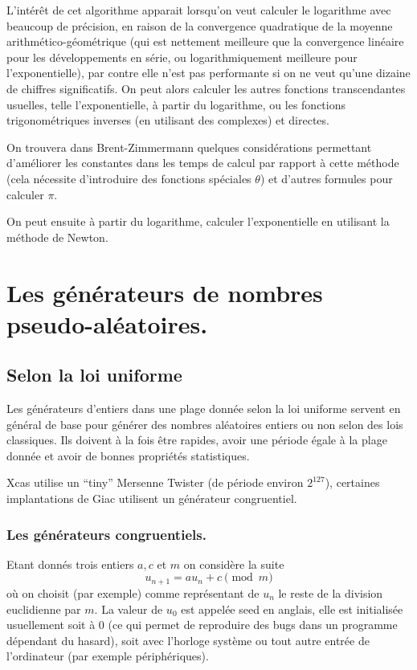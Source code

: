 \documentclass[a4paper,11pt]{article}
\begin{document}
L'int\'er\^et de cet algorithme apparait lorsqu'on veut calculer
le logarithme avec beaucoup de pr\'ecision, en raison de la
convergence quadratique de la moyenne arithm\'etico-g\'eom\'etrique
(qui est nettement meilleure que la convergence lin\'eaire
pour les d\'eveloppements en s\'erie, ou logarithmiquement
meilleure pour l'exponentielle), par contre elle n'est pas
performante si on ne veut qu'une dizaine de chiffres significatifs. 
On peut alors calculer les autres
fonctions transcendantes usuelles, telle l'exponentielle,
\`a partir du logarithme, ou les fonctions trigonom\'etriques
inverses (en utilisant des complexes) et directes.

On trouvera dans Brent-Zimmermann quelques consid\'erations permettant
d'am\'eliorer les constantes dans les temps de calcul par rapport
\`a cette m\'ethode (cela n\'ecessite d'introduire des fonctions 
sp\'eciales $\theta$) et d'autres formules pour calculer $\pi$.

On peut ensuite \`a partir du logarithme, calculer l'exponentielle
en utilisant la m\'ethode de Newton.

\section{Les générateurs de nombres pseudo-aléatoires.}
\label{sec:random}
\subsection{Selon la loi uniforme}
Les générateurs d'entiers dans une plage donnée selon la loi
uniforme servent en général de base pour générer des 
nombres aléatoires entiers ou non selon des lois classiques.
Ils doivent à la fois être rapides, avoir une période égale à
la plage donnée et avoir de bonnes propriétés statistiques.

Xcas utilise un ``tiny'' Mersenne Twister (de période environ $2^{127}$),
certaines implantations de Giac utilisent un générateur congruentiel.

\subsubsection{Les générateurs congruentiels.}
Etant donnés trois entiers $a, c$ et $m$ on considère la suite
$$ u_{n+1}=au_n+c \pmod m $$
où on choisit (par exemple) comme représentant de $u_n$
le reste de la division euclidienne par $m$. La valeur de $u_0$
est appelée seed en anglais, elle est initialisée usuellement
soit à 0 (ce qui permet de reproduire des bugs dans un programme
dépendant du hasard), soit avec l'horloge système ou tout autre
entrée de l'ordinateur (par exemple périphériques).
\end{document}
